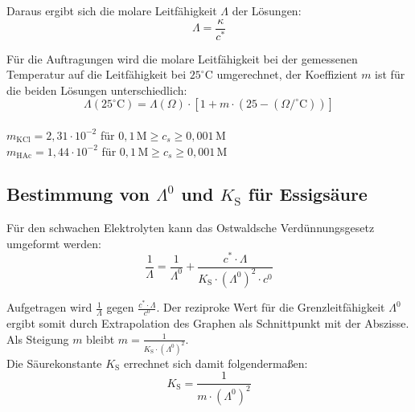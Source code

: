 \documentclass[12pt,a4paper,titlepage,headinclude,bibtotoc]{scrartcl}
\begin{document}
Daraus ergibt sich die molare Leitfähigkeit $\Lambda$ der Lösungen:\\

\begin{equation}
\Lambda = \frac{\kappa}{c^*}
\end{equation}

Für die Auftragungen wird die molare Leitfähigkeit bei der gemessenen Temperatur auf die Leitfähigkeit bei $25^\circ\text{C}$ umgerechnet, der Koeffizient $m$ ist für die beiden Lösungen unterschiedlich:\\

\begin{equation}
\Lambda (25^\circ\text{C}) = \Lambda(\Omega) \cdot [1+ m \cdot (25- (\Omega/^\circ\text{C}))]
\end{equation}\\

{\centering
$m_{\mathrm{KCl}} = 2,31 \cdot 10^{-2}$ für $0,1\, \mathrm{M} \ge c_s \ge 0,001\, \mathrm{M}$\\
$m_{\mathrm{HAc}} = 1,44 \cdot 10^{-2}$ für $0,1\, \mathrm{M} \ge c_s \ge 0,001\, \mathrm{M}$\\}



\subsection{Bestimmung von $\Lambda^0$ und $K_{\mathrm{S}}$ für Essigsäure}

Für den schwachen Elektrolyten kann das Ostwaldsche Verdünnungsgesetz umgeformt werden:\\

\begin{equation}
\frac{1}{\Lambda} = \frac{1}{\Lambda^0} + \frac{c^* \cdot \Lambda}{K_{\mathrm{S}} \cdot (\Lambda^0)^2 \cdot c^0}
\end{equation}

Aufgetragen wird $\frac{1}{\Lambda}$ gegen $\frac{c^* \cdot \Lambda}{c^0}$.
Der reziproke Wert für die Grenzleitfähigkeit $\Lambda^0$ ergibt somit durch Extrapolation des Graphen als Schnittpunkt mit der Abszisse.\\
Als Steigung $m$ bleibt  $m = \frac{1}{K_{\mathrm{S}} \cdot (\Lambda^0)^2 }$.\\
Die Säurekonstante $K_{\mathrm{S}}$ errechnet sich damit folgendermaßen:\\

\begin{equation}
K_{\mathrm{S}} = \frac{1}{m \cdot (\Lambda^0)^2}
\end{equation}
\end{document}
